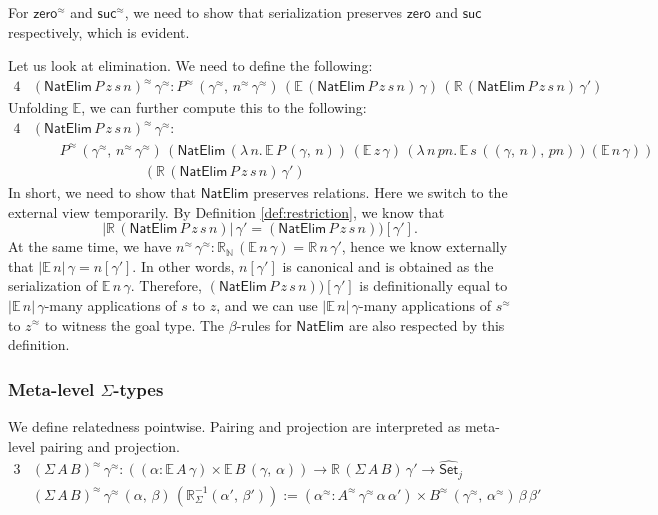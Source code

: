 \documentclass[acmsmall]{acmart}
\newcommand{\mit}[1]{\mathit{#1}}
\newcommand{\msf}[1]{\mathsf{#1}}
\newcommand{\mbb}[1]{\mathbb{#1}}
\newcommand{\wh}[1]{\widehat{#1}}
\newcommand{\zero}{\msf{zero}}
\newcommand{\suc}{\msf{suc}}
\newcommand{\Set}{\mathsf{Set}}
\newcommand{\ev}{\mbb{E}}
\newcommand{\re}{\mbb{R}}
\theoremstyle{remark}
\newcommand{\whset}{\wh{\Set}}
\newcommand{\rel}{^{\approx}}
\begin{document}
For $\zero\rel$ and $\suc\rel$, we need to show that serialization preserves
$\zero$ and $\suc$ respectively, which is evident.

Let us look at elimination. We need to define the following:
\begin{alignat*}{4}
  &(\msf{NatElim}\,P\,z\,s\,n)\rel\,\gamma\rel :
  P\rel\,(\gamma\rel,\,n\rel\,\gamma\rel)\,(\ev\,(\msf{NatElim}\,P\,z\,s\,n)\,\gamma)\,
                                           (\re\,(\msf{NatElim}\,P\,z\,s\,n)\,\gamma')
\end{alignat*}
Unfolding $\ev$, we can further compute this to the following:
\begin{alignat*}{4}
  &(\msf{NatElim}\,P\,z\,s\,n)\rel\,\gamma\rel : \\
  &\hspace{2em}P\rel\,(\gamma\rel,\,n\rel\,\gamma\rel)\,
  (\msf{NatElim}\,(\lambda\,n.\,\ev\,P\,(\gamma,\,n))\,
                  (\ev\,z\,\gamma)\,
                  (\lambda\,n\,\mit{pn}.\,\ev\,s\,((\gamma,\,n),\,\mit{pn}))
                  (\ev\,n\,\gamma))\\
  &\hspace{8em}(\re\,(\msf{NatElim}\,P\,z\,s\,n)\,\gamma')
\end{alignat*}
In short, we need to show that $\msf{NatElim}$ preserves relations. Here we
switch to the external view temporarily. By Definition \ref{def:restriction}, we know that
\[
   |\re\,(\msf{NatElim}\,P\,z\,s\,n)|\,\gamma' = (\msf{NatElim}\,P\,z\,s\,n))[\gamma'].
\]
At the same time, we have $n\rel\,\gamma\rel : \re_{\mbb{N}}\,(\ev\,n\,\gamma) =
\re\,n\,\gamma'$, hence we know externally that $|\ev\,n|\,\gamma = n[\gamma']$.
In other words, $n[\gamma']$ is canonical and is obtained as the serialization
of $\ev\,n\,\gamma$. Therefore, $(\msf{NatElim}\,P\,z\,s\,n))[\gamma']$ is
definitionally equal to $|\ev\,n|\,\gamma$-many applications of $s$ to
$z$, and we can use $|\ev\,n|\,\gamma$-many applications of $s\rel$ to $z\rel$
to witness the goal type. The $\beta$-rules for $\msf{NatElim}$ are also respected
by this definition.

\subsubsection{Meta-level $\Sigma$-types} We define relatedness pointwise. Pairing and projection
are interpreted as meta-level pairing and projection.
\begin{alignat*}{3}
  &(\Sigma\,A\,B)\rel\,\gamma\rel : ((\alpha : \ev\,A\,\gamma) \times \ev\,B\,(\gamma,\,\alpha))
             \to \re\,(\Sigma\,A\,B)\,\gamma' \to \whset_j\\
  &(\Sigma\,A\,B)\rel\,\gamma\rel\,(\alpha,\,\beta)\,(\re_{\Sigma}^{-1}(\alpha',\,\beta')) :=
             (\alpha\rel : A\rel\,\gamma\rel\,\alpha\,\alpha') \times B\rel\,(\gamma\rel,\,\alpha\rel)\,\beta\,\beta'
\end{alignat*}
\end{document}
